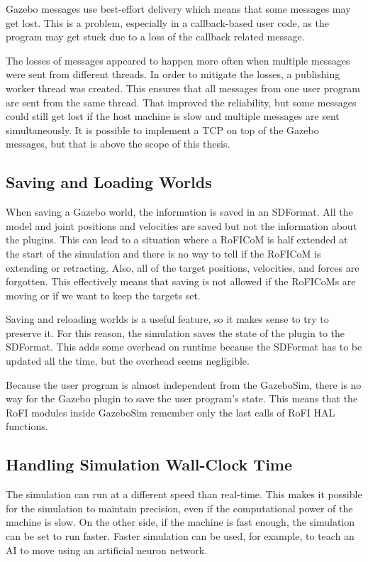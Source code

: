 \documentclass[
  printed, %
  color,   %
  notable, %
  oneside, %
  nolof,   %
  nolot,   %
  nocover,
]{fithesis3}
\begin{document}
Gazebo messages use best-effort delivery which means that some messages may get lost.
This is a problem, especially in a callback-based user code, as the program may get stuck due to a loss of the callback related message.

The losses of messages appeared to happen more often when multiple messages were sent from different threads.
In order to mitigate the losses, a publishing worker thread was created.
This ensures that all messages from one user program are sent from the same thread.
That improved the reliability, but some messages could still get lost if the host machine is slow and multiple messages are sent simultaneously.
It is possible to implement a TCP on top of the Gazebo messages, but that is above the scope of this thesis.

\subsection{Saving and Loading Worlds}

When saving a Gazebo world, the information is saved in an SDFormat.
All the model and joint positions and velocities are saved but not the information about the plugins.
This can lead to a situation where a RoFICoM is half extended at the start of the simulation and there is no way to tell if the RoFICoM is extending or retracting.
Also, all of the target positions, velocities, and forces are forgotten.
This effectively means that saving is not allowed if the RoFICoMs are moving or if we want to keep the targets set.

Saving and reloading worlds is a useful feature, so it makes sense to try to preserve it.
For this reason, the simulation saves the state of the plugin to the SDFormat.
This adds some overhead on runtime because the SDFormat has to be updated all the time, but the overhead seems negligible.

Because the user program is almost independent from the GazeboSim, there is no way for the Gazebo plugin to save the user program's state.
This means that the RoFI modules inside GazeboSim remember only the last calls of RoFI HAL functions.

\subsection{Handling Simulation Wall-Clock Time}

The simulation can run at a different speed than real-time.
This makes it possible for the simulation to maintain precision, even if the computational power of the machine is slow.
On the other side, if the machine is fast enough, the simulation can be set to run faster.
Faster simulation can be used, for example, to teach an AI to move using an artificial neuron network.
\end{document}
